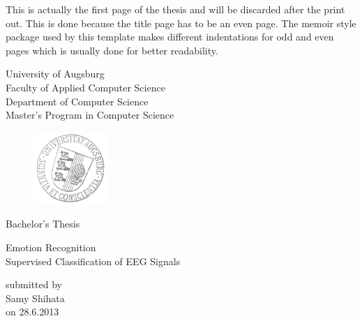 \documentclass[12pt, a4paper, fleqn]{memoir}%
\begin{document}
\frontmatter

\pagestyle{empty}
This is actually the first page of the thesis and will be discarded after the print out. This is done because 
the title page has to be an even page. The memoir style package used by this template makes different indentations 
for odd and even pages which is usually done for better readability.  
\clearpage
\pagestyle{empty}
\rmfamily
\noindent
\begin{center}
University of Augsburg\\
Faculty of Applied Computer Science\\
Department of Computer Science\\
Master's Program in Computer Science\\
\end{center}
\begin{figure}[h]
\centering
\includegraphics[width=0.25\textwidth]{logo.png}
\end{figure}
\vfill\vfill
\begin{center}
\Large
Bachelor's Thesis\\
\end{center}
\vspace{2.0em}
\begin{center}
\Large
\LARGE Emotion Recognition\\ \vspace{10pt} 
\Large Supervised Classification of EEG Signals
\end{center}
\vspace{2.0em}
\begin{center}
    \normalsize
    submitted by\\
    \large
    Samy Shihata\\
    \normalsize
    on 28.6.2013
\end{center}
\end{document}
